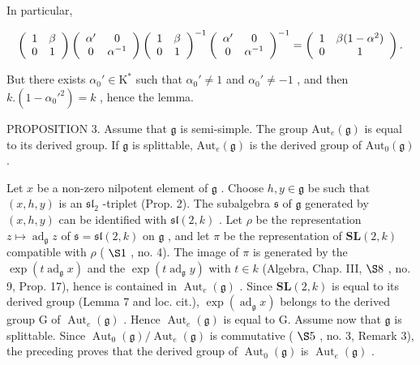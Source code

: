In particular,

\[
\left( \begin{array}{c c} 1 & \beta \\ 0 & 1 \end{array} \right) \left( \begin{array}{c c} \alpha^ {\prime} & 0 \\ 0 & \alpha^ {- 1} \end{array} \right) \left( \begin{array}{c c} 1 & \beta \\ 0 & 1 \end{array} \right) ^ {- 1} \left( \begin{array}{c c} \alpha^ {\prime} & 0 \\ 0 & \alpha^ {- 1} \end{array} \right) ^ {- 1} = \left( \begin{array}{c c} 1 & \beta (1 - \alpha^ {2}) \\ 0 & 1 \end{array} \right).
\]

But there exists \(\alpha_0' \in \mathrm{K}^*\) such that \(\alpha_0' \neq 1\) and \(\alpha_0' \neq -1\) , and then \(k.(1 - \alpha_0'^2) = k\) , hence the lemma.

PROPOSITION 3. Assume that \(\mathfrak{g}\) is semi-simple. The group \(\mathrm{Aut}_e(\mathfrak{g})\) is equal to its derived group. If \(\mathfrak{g}\) is splittable, \(\mathrm{Aut}_e(\mathfrak{g})\) is the derived group of \(\mathrm{Aut}_0(\mathfrak{g})\) .

Let \(x\) be a non-zero nilpotent element of \(\mathfrak{g}\) . Choose \(h, y \in \mathfrak{g}\) be such that \((x, h, y)\) is an \(\mathfrak{sl}_2\) -triplet (Prop. 2). The subalgebra \(\mathfrak{s}\) of \(\mathfrak{g}\) generated by \((x, h, y)\) can be identified with \(\mathfrak{sl}(2, k)\) . Let \(\rho\) be the representation \(z \mapsto \operatorname{ad}_{\mathfrak{g}} z\) of \(\mathfrak{s} = \mathfrak{sl}(2, k)\) on \(\mathfrak{g}\) , and let \(\pi\) be the representation of \(\mathbf{SL}(2, k)\) compatible with \(\rho\) ( \(\S 1\) , no. 4). The image of \(\pi\) is generated by the \(\exp(t\operatorname{ad}_{\mathfrak{g}} x)\) and the \(\exp(t\operatorname{ad}_{\mathfrak{g}} y)\) with \(t \in k\) (Algebra, Chap. III, \(\S 8\) , no. 9, Prop. 17), hence is contained in \(\operatorname{Aut}_e(\mathfrak{g})\) . Since \(\mathbf{SL}(2, k)\) is equal to its derived group (Lemma 7 and loc. cit.), \(\exp(\operatorname{ad}_{\mathfrak{g}} x)\) belongs to the derived group G of \(\operatorname{Aut}_e(\mathfrak{g})\) . Hence \(\operatorname{Aut}_e(\mathfrak{g})\) is equal to G. Assume now that \(\mathfrak{g}\) is splittable. Since \(\operatorname{Aut}_0(\mathfrak{g}) / \operatorname{Aut}_e(\mathfrak{g})\) is commutative ( \(\S 5\) , no. 3, Remark 3), the preceding proves that the derived group of \(\operatorname{Aut}_0(\mathfrak{g})\) is \(\operatorname{Aut}_e(\mathfrak{g})\) .

